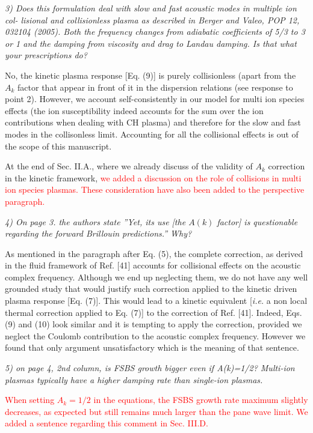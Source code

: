 \documentclass{article}
\def\tc{\textcolor{red}}
\begin{document}
\textit{
3)  Does this formulation deal with slow and fast acoustic modes in multiple ion col-
lisional and collisionless plasma as described in Berger and Valeo, POP 12, 032104
(2005). Both the frequency changes from adiabatic coefficients of 5/3 to 3 or 1 and the
damping from viscosity and drag to Landau damping. Is that what your prescriptions
do?}

No, the kinetic plasma response [Eq. (9)] is purely collisionless (apart from the $A_k$ factor that appear in front of it in the dispersion relations (see response to point 2). However, we account self-consistently in our model for multi ion species effects (the ion susceptibility indeed accounts for the sum over the ion contributions when dealing with CH plasma) and therefore for the slow and fast modes in the collisonless limit. Accounting for all the collisional effects is out of the scope of this manuscript. 

At the end of Sec. II.A., where we already discuss of the validity of $A_k$ correction in the kinetic framework, 
\tc{we added a discussion  on the role of collisions in multi ion species plasmas. These consideration have also been added to the perspective paragraph. } 

\textit{
4) On page 3. the authors state ”Yet, its use [the $A(k)$ factor] is questionable regarding
the forward Brillouin predictions.” Why?}

As mentioned in the paragraph after Eq. (5), the complete correction, as derived in the fluid framework of Ref. [41] accounts for collisional effects on the  acoustic complex frequency. Although we end up neglecting them, we do not have any well grounded  study that would justify such correction applied to the kinetic driven plasma response  [Eq. (7)]. This would  lead  to a  kinetic equivalent [\emph{i.e.} a non local thermal correction applied to Eq.  (7)] to the correction of Ref. [41]. 
Indeed, Eqs. (9) and (10) look similar and it is tempting to apply the correction, provided we neglect the Coulomb contribution to the acoustic complex frequency. However we found that only argument unsatisfactory which is the meaning of that sentence. 

\textit{
5)  on page 4, 2nd column, is FSBS growth bigger even if A(k)=1/2? Multi-ion plasmas
typically have a higher damping rate than single-ion plasmas.}

\tc{When setting $A_k=1/2$ in the equations, the FSBS growth rate maximum slightly decreases, as expected but still remains much larger than the pane wave limit. We added a sentence regarding this comment in Sec. III.D.}
\end{document}
